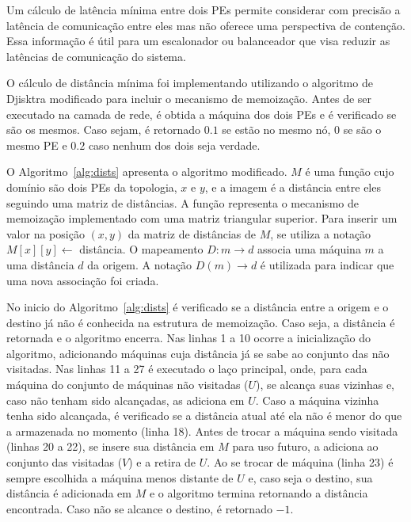 Um cálculo de latência mínima entre dois PEs permite considerar com precisão a latência de comunicação entre eles mas não oferece uma perspectiva de contenção.
Essa informação é útil para um escalonador ou balanceador que visa reduzir as latências de comunicação do sistema.

O cálculo de distância mínima foi implementando utilizando o algoritmo de Djisktra modificado para incluir o mecanismo de memoização.
Antes de ser executado na camada de rede, é obtida a máquina dos dois PEs e é verificado se são os mesmos. Caso sejam, é retornado $0.1$ se estão no mesmo nó, $0$ se são o mesmo PE e $0.2$ caso nenhum dos dois seja verdade.

O Algoritmo~\ref{alg:dists} apresenta o algoritmo modificado.
$M$ é uma função cujo domínio são dois PEs da topologia, $x$ e $y$, e a imagem é a distância entre eles seguindo uma matriz de distâncias. %
A função representa o mecanismo de memoização implementado com uma matriz triangular superior.
Para inserir um valor na posição $(x, y)$ da matriz de distâncias de $M$, se utiliza a notação $M[x][y] \leftarrow$ distância.
O mapeamento $D:m \rightarrow d$ associa uma máquina $m$ a uma distância $d$ da origem.
A notação $D(m) \rightarrow d$ é utilizada para indicar que uma nova associação foi criada.

No inicio do Algoritmo~\ref{alg:dists} é verificado se a distância entre a origem e o destino já não é conhecida na estrutura de memoização.
Caso seja, a distância é retornada e o algoritmo encerra.
Nas linhas 1 a 10 ocorre a inicialização do algoritmo, adicionando máquinas cuja distância já se sabe ao conjunto das não visitadas. 
Nas linhas 11 a 27 é executado o laço principal, onde, para cada máquina do conjunto de máquinas não visitadas ($U$), se alcança suas vizinhas e, caso não tenham sido alcançadas, as adiciona em $U$.
Caso a máquina vizinha tenha sido alcançada, é verificado se a distância atual até ela não é menor do que a armazenada no momento (linha 18).
Antes de trocar a máquina sendo visitada (linhas 20 a 22), se insere sua distância em $M$ para uso futuro, a adiciona ao conjunto das visitadas ($V$) e a retira de $U$.
Ao se trocar de máquina (linha 23) é sempre escolhida a máquina menos distante de $U$ e, caso seja o destino, sua distância é adicionada em $M$ e o algoritmo termina retornando a distância encontrada.
Caso não se alcance o destino, é retornado $-1$.

